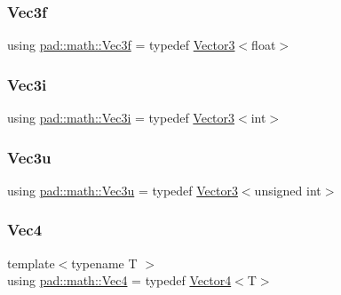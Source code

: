 \mbox{\label{namespacepad_1_1math_ac2c67cf958d2b7d769b35022eb197757}} 
\subsubsection{\texorpdfstring{Vec3f}{Vec3f}}
{\footnotesize\ttfamily using \mbox{\hyperlink{namespacepad_1_1math_ac2c67cf958d2b7d769b35022eb197757}{pad\+::math\+::\+Vec3f}} = typedef \mbox{\hyperlink{structpad_1_1math_1_1_vector3}{Vector3}}$<$float$>$}

\mbox{\label{namespacepad_1_1math_acccfc4afcdb1f72c6881e0e74078eb7b}} 
\subsubsection{\texorpdfstring{Vec3i}{Vec3i}}
{\footnotesize\ttfamily using \mbox{\hyperlink{namespacepad_1_1math_acccfc4afcdb1f72c6881e0e74078eb7b}{pad\+::math\+::\+Vec3i}} = typedef \mbox{\hyperlink{structpad_1_1math_1_1_vector3}{Vector3}}$<$int$>$}

\mbox{\label{namespacepad_1_1math_ad75d374d51ed67887ddde9d2111e69fd}} 
\subsubsection{\texorpdfstring{Vec3u}{Vec3u}}
{\footnotesize\ttfamily using \mbox{\hyperlink{namespacepad_1_1math_ad75d374d51ed67887ddde9d2111e69fd}{pad\+::math\+::\+Vec3u}} = typedef \mbox{\hyperlink{structpad_1_1math_1_1_vector3}{Vector3}}$<$unsigned int$>$}

\mbox{\label{namespacepad_1_1math_a97a1193114b33cea7a82ae656d507825}} 
\subsubsection{\texorpdfstring{Vec4}{Vec4}}
{\footnotesize\ttfamily template$<$typename T $>$ \\
using \mbox{\hyperlink{namespacepad_1_1math_a97a1193114b33cea7a82ae656d507825}{pad\+::math\+::\+Vec4}} = typedef \mbox{\hyperlink{structpad_1_1math_1_1_vector4}{Vector4}}$<$T$>$}

